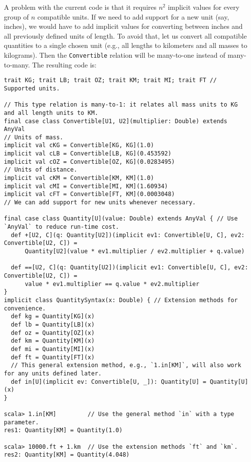 A problem with the current code is that it requires $n^{2}$ implicit
values for every group of $n$ compatible units. If we need to add
support for a new unit (say, inches), we would have to add implicit
values for converting between inches and all previously defined units
of length. To avoid that, let us convert all compatible quantities
to a single chosen unit (e.g., all lengths to kilometers and all masses
to kilograms). Then the \lstinline!Convertible! relation will be
many-to-one instead of many-to-many.
The resulting code is:
\begin{lstlisting}[frame=single,fillcolor={\color{black}},framesep={0.2mm},framexleftmargin=2mm,framexrightmargin=2mm,framextopmargin=2mm,framexbottommargin=2mm]
trait KG; trait LB; trait OZ; trait KM; trait MI; trait FT // Supported units.

// This type relation is many-to-1: it relates all mass units to KG and all length units to KM.
final case class Convertible[U1, U2](multiplier: Double) extends AnyVal
// Units of mass.
implicit val cKG = Convertible[KG, KG](1.0)
implicit val cLB = Convertible[LB, KG](0.453592)
implicit val cOZ = Convertible[OZ, KG](0.0283495)
// Units of distance.
implicit val cKM = Convertible[KM, KM](1.0)
implicit val cMI = Convertible[MI, KM](1.60934)
implicit val cFT = Convertible[FT, KM](0.0003048)
// We can add support for new units whenever necessary.

final case class Quantity[U](value: Double) extends AnyVal { // Use `AnyVal` to reduce run-time cost.
  def +[U2, C](q: Quantity[U2])(implicit ev1: Convertible[U, C], ev2: Convertible[U2, C]) =
      Quantity[U2](value * ev1.multiplier / ev2.multiplier + q.value)

  def ==[U2, C](q: Quantity[U2])(implicit ev1: Convertible[U, C], ev2: Convertible[U2, C]) =
      value * ev1.multiplier == q.value * ev2.multiplier
}
implicit class QuantitySyntax(x: Double) { // Extension methods for convenience.
  def kg = Quantity[KG](x)
  def lb = Quantity[LB](x)
  def oz = Quantity[OZ](x)
  def km = Quantity[KM](x)
  def mi = Quantity[MI](x)
  def ft = Quantity[FT](x)
  // This general extension method, e.g., `1.in[KM]`, will also work for any units defined later.
  def in[U](implicit ev: Convertible[U, _]): Quantity[U] = Quantity[U](x)
}

scala> 1.in[KM]         // Use the general method `in` with a type parameter.
res1: Quantity[KM] = Quantity(1.0)

scala> 10000.ft + 1.km  // Use the extension methods `ft` and `km`.
res2: Quantity[KM] = Quantity(4.048)


\end{lstlisting}
